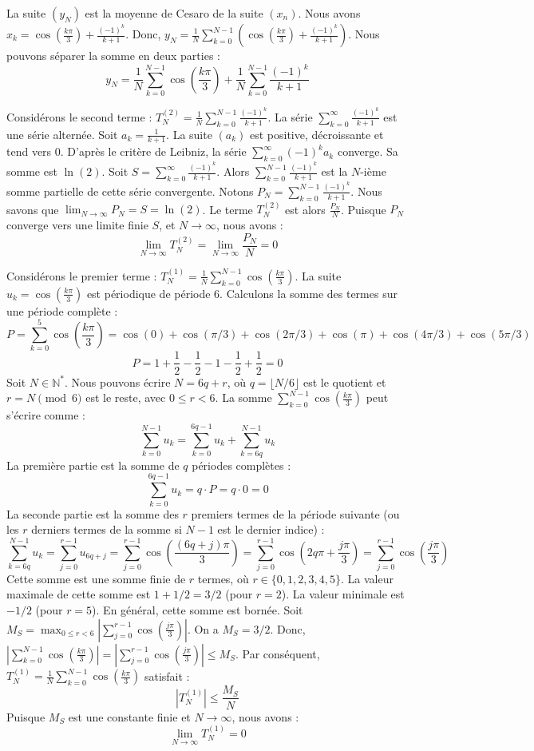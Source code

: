 \documentclass{report}
\begin{document}
La suite $(y_N)$ est la moyenne de Cesaro de la suite $(x_n)$.
Nous avons $x_k = \cos\left(\frac{k\pi}{3}\right) + \frac{(-1)^k}{k+1}$.
Donc, $y_N = \frac{1}{N} \sum_{k=0}^{N-1} \left(\cos\left(\frac{k\pi}{3}\right) + \frac{(-1)^k}{k+1}\right)$.
Nous pouvons séparer la somme en deux parties :
$$y_N = \frac{1}{N} \sum_{k=0}^{N-1} \cos\left(\frac{k\pi}{3}\right) + \frac{1}{N} \sum_{k=0}^{N-1} \frac{(-1)^k}{k+1}$$

Considérons le second terme : $T_N^{(2)} = \frac{1}{N} \sum_{k=0}^{N-1} \frac{(-1)^k}{k+1}$.
La série $\sum_{k=0}^{\infty} \frac{(-1)^k}{k+1}$ est une série alternée.
Soit $a_k = \frac{1}{k+1}$. La suite $(a_k)$ est positive, décroissante et tend vers 0.
D'après le critère de Leibniz, la série $\sum_{k=0}^{\infty} (-1)^k a_k$ converge. Sa somme est $\ln(2)$.
Soit $S = \sum_{k=0}^{\infty} \frac{(-1)^k}{k+1}$.
Alors $\sum_{k=0}^{N-1} \frac{(-1)^k}{k+1}$ est la $N$-ième somme partielle de cette série convergente.
Notons $P_N = \sum_{k=0}^{N-1} \frac{(-1)^k}{k+1}$. Nous savons que $\lim_{N \to \infty} P_N = S = \ln(2)$.
Le terme $T_N^{(2)}$ est alors $\frac{P_N}{N}$.
Puisque $P_N$ converge vers une limite finie $S$, et $N \to \infty$, nous avons :
$$\lim_{N \to \infty} T_N^{(2)} = \lim_{N \to \infty} \frac{P_N}{N} = 0$$

Considérons le premier terme : $T_N^{(1)} = \frac{1}{N} \sum_{k=0}^{N-1} \cos\left(\frac{k\pi}{3}\right)$.
La suite $u_k = \cos\left(\frac{k\pi}{3}\right)$ est périodique de période 6.
Calculons la somme des termes sur une période complète :
$$P = \sum_{k=0}^{5} \cos\left(\frac{k\pi}{3}\right) = \cos(0) + \cos(\pi/3) + \cos(2\pi/3) + \cos(\pi) + \cos(4\pi/3) + \cos(5\pi/3)$$
$$P = 1 + \frac{1}{2} - \frac{1}{2} - 1 - \frac{1}{2} + \frac{1}{2} = 0$$
Soit $N \in \mathbb{N}^*$. Nous pouvons écrire $N = 6q + r$, où $q = \lfloor N/6 \rfloor$ est le quotient et $r = N \pmod 6$ est le reste, avec $0 \le r < 6$.
La somme $\sum_{k=0}^{N-1} \cos\left(\frac{k\pi}{3}\right)$ peut s'écrire comme :
$$\sum_{k=0}^{N-1} u_k = \sum_{k=0}^{6q-1} u_k + \sum_{k=6q}^{N-1} u_k$$
La première partie est la somme de $q$ périodes complètes :
$$\sum_{k=0}^{6q-1} u_k = q \cdot P = q \cdot 0 = 0$$
La seconde partie est la somme des $r$ premiers termes de la période suivante (ou les $r$ derniers termes de la somme si $N-1$ est le dernier indice) :
$$\sum_{k=6q}^{N-1} u_k = \sum_{j=0}^{r-1} u_{6q+j} = \sum_{j=0}^{r-1} \cos\left(\frac{(6q+j)\pi}{3}\right) = \sum_{j=0}^{r-1} \cos\left(2q\pi + \frac{j\pi}{3}\right) = \sum_{j=0}^{r-1} \cos\left(\frac{j\pi}{3}\right)$$
Cette somme est une somme finie de $r$ termes, où $r \in \{0, 1, 2, 3, 4, 5\}$.
La valeur maximale de cette somme est $1 + 1/2 = 3/2$ (pour $r=2$). La valeur minimale est $-1/2$ (pour $r=5$).
En général, cette somme est bornée. Soit $M_S = \max_{0 \le r < 6} \left|\sum_{j=0}^{r-1} \cos\left(\frac{j\pi}{3}\right)\right|$. On a $M_S = 3/2$.
Donc, $\left|\sum_{k=0}^{N-1} \cos\left(\frac{k\pi}{3}\right)\right| = \left|\sum_{j=0}^{r-1} \cos\left(\frac{j\pi}{3}\right)\right| \le M_S$.
Par conséquent, $T_N^{(1)} = \frac{1}{N} \sum_{k=0}^{N-1} \cos\left(\frac{k\pi}{3}\right)$ satisfait :
$$\left|T_N^{(1)}\right| \le \frac{M_S}{N}$$
Puisque $M_S$ est une constante finie et $N \to \infty$, nous avons :
$$\lim_{N \to \infty} T_N^{(1)} = 0$$
\end{document}
